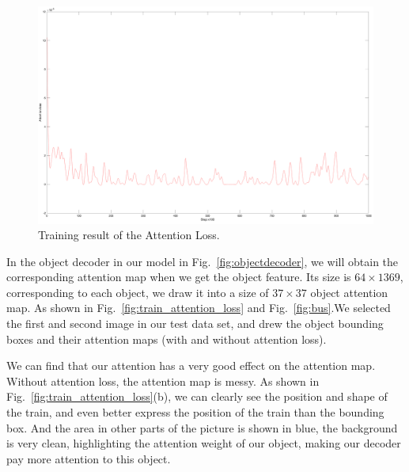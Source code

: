 \begin{figure}[h]
	\centering
	\includegraphics[width=0.8\linewidth]{figures/result/attention_loss}
	\caption[Training result of the Attention Loss]{Training result of the Attention Loss.}
	\label{fig:attention_loss_result}
\end{figure}

In the object decoder in our model in Fig.~\ref{fig:objectdecoder}, we will obtain the corresponding attention map when we get the object feature. Its size is $ 64\times1369 $, corresponding to each object, we draw it into a size of $ 37\times37 $ object attention map. As shown in Fig.~\ref{fig:train_attention_loss} and Fig.~\ref{fig:bus}.We selected the first and second image in our test data set, and drew the object bounding boxes and their attention maps (with and without attention loss).

We can find that our attention has a very good effect on the attention map. Without attention loss, the attention map is messy. As shown in Fig.~\ref{fig:train_attention_loss}(b), we can clearly see the position and shape of the train, and even better express the position of the train than the bounding box. And the area in other parts of the picture is shown in blue, the background is very clean, highlighting the attention weight of our object, making our decoder pay more attention to this object.

